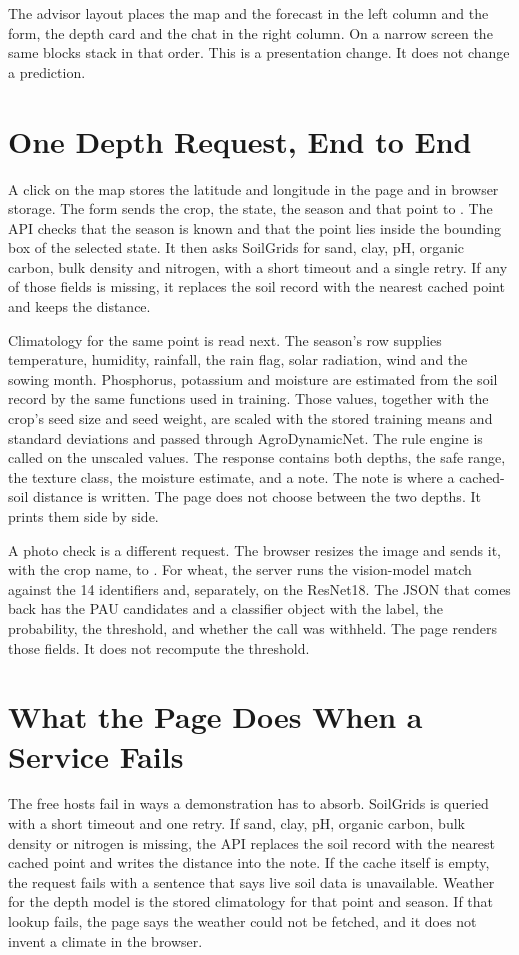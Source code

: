 The advisor layout places the map and the forecast in the left column and the form, the depth card and the chat in the right column. On a narrow screen the same blocks stack in that order. This is a presentation change. It does not change a prediction.

\section{One Depth Request, End to End}
A click on the map stores the latitude and longitude in the page and in browser storage. The form sends the crop, the state, the season and that point to . The API checks that the season is known and that the point lies inside the bounding box of the selected state. It then asks SoilGrids for sand, clay, pH, organic carbon, bulk density and nitrogen, with a short timeout and a single retry. If any of those fields is missing, it replaces the soil record with the nearest cached point and keeps the distance.

Climatology for the same point is read next. The season's row supplies temperature, humidity, rainfall, the rain flag, solar radiation, wind and the sowing month. Phosphorus, potassium and moisture are estimated from the soil record by the same functions used in training. Those values, together with the crop's seed size and seed weight, are scaled with the stored training means and standard deviations and passed through AgroDynamicNet. The rule engine is called on the unscaled values. The response contains both depths, the safe range, the texture class, the moisture estimate, and a note. The note is where a cached-soil distance is written. The page does not choose between the two depths. It prints them side by side.

A photo check is a different request. The browser resizes the image and sends it, with the crop name, to . For wheat, the server runs the vision-model match against the 14 identifiers and, separately,  on the ResNet18. The JSON that comes back has the PAU candidates and a classifier object with the label, the probability, the threshold, and whether the call was withheld. The page renders those fields. It does not recompute the threshold.

\section{What the Page Does When a Service Fails}
The free hosts fail in ways a demonstration has to absorb. SoilGrids is queried with a short timeout and one retry. If sand, clay, pH, organic carbon, bulk density or nitrogen is missing, the API replaces the soil record with the nearest cached point and writes the distance into the note. If the cache itself is empty, the request fails with a sentence that says live soil data is unavailable. Weather for the depth model is the stored climatology for that point and season. If that lookup fails, the page says the weather could not be fetched, and it does not invent a climate in the browser.

